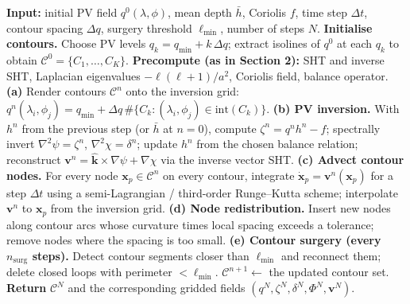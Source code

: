 \documentclass[11pt]{article}
\newcommand{\bvec}[1]{\boldsymbol{#1}}
\begin{document}
\begin{algorithm}[H]
\caption{CASL on the sphere for the inviscid shallow-water equations.}
\begin{algorithmic}[1]
\State \textbf{Input:} initial PV field $q^{0}(\lambda,\phi)$, mean
        depth $\bar h$, Coriolis $f$, time step $\Delta t$,
        contour spacing $\Delta q$, surgery threshold
        $\ell_{\min}$, number of steps $N$.
\State \textbf{Initialise contours.}
        Choose PV levels $q_{k} = q_{\min} + k\,\Delta q$;
        extract isolines of $q^{0}$ at each $q_{k}$ to obtain
        $\mathcal{C}^{0} = \{C_{1},\dots,C_{K}\}$.
\State \textbf{Precompute (as in Section 2):}
        SHT and inverse SHT,
        Laplacian eigenvalues $-\ell(\ell+1)/a^{2}$,
        Coriolis field, balance operator.
    \State \textbf{(a)} Render contours $\mathcal{C}^{n}$ onto the
        inversion grid:
        $q^{n}(\lambda_{i},\phi_{j})
            = q_{\min} + \Delta q\,\#\{C_{k}: (\lambda_{i},\phi_{j})\in
            \mathrm{int}(C_{k})\}$.
    \State \textbf{(b) PV inversion.}
        With $h^{n}$ from the previous step (or $\bar h$ at $n=0$),
        compute $\zeta^{n} = q^{n} h^{n} - f$;
        spectrally invert $\nabla^{2}\psi = \zeta^{n}$,
        $\nabla^{2}\chi = \delta^{n}$;
        update $h^{n}$ from the chosen balance relation;
        reconstruct $\bvec{v}^{n} = \hat{\bvec{k}}\!\times\!\nabla\psi
        + \nabla\chi$ via the inverse vector SHT.
    \State \textbf{(c) Advect contour nodes.}
        For every node $\bvec{x}_{p}\in\mathcal{C}^{n}$ on every
        contour, integrate
        $\dot{\bvec{x}}_{p} = \bvec{v}^{n}(\bvec{x}_{p})$
        for a step $\Delta t$ using a semi-Lagrangian /
        third-order Runge--Kutta scheme; interpolate
        $\bvec{v}^{n}$ to $\bvec{x}_{p}$ from the inversion grid.
    \State \textbf{(d) Node redistribution.}
        Insert new nodes along contour arcs whose curvature times
        local spacing exceeds a tolerance; remove nodes where the
        spacing is too small.
    \State \textbf{(e) Contour surgery (every $n_{\mathrm{surg}}$
        steps).}
        Detect contour segments closer than $\ell_{\min}$ and
        reconnect them; delete closed loops with perimeter
        $<\ell_{\min}$.
    \State $\mathcal{C}^{n+1} \gets$ the updated contour set.
\EndFor
\State \textbf{Return} $\mathcal{C}^{N}$ and the corresponding gridded
        fields $(q^{N},\zeta^{N},\delta^{N},\Phi^{N},\bvec{v}^{N})$.
\end{algorithmic}
\end{algorithm}
\end{document}
